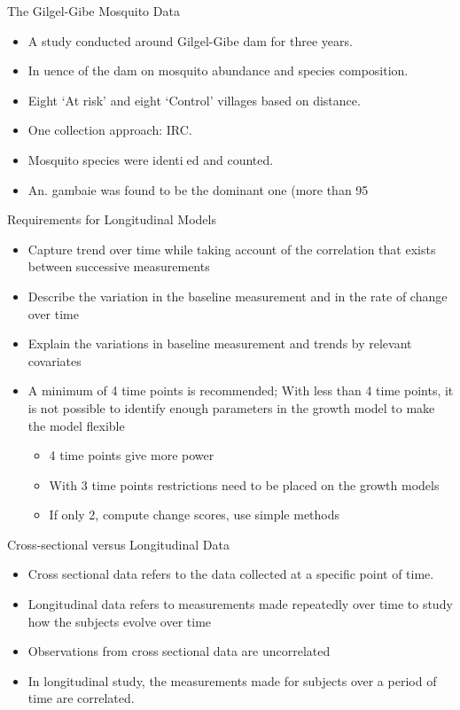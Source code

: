 \documentclass{beamer}
\begin{document}
\begin{frame}{The Gilgel-Gibe Mosquito Data}
\begin{itemize}
	\item A study conducted around Gilgel-Gibe dam for three years.
	\item In
uence of the dam on mosquito abundance and species composition.
	\item Eight `At risk' and eight `Control' villages based on distance.
	\item One collection approach: IRC.
	\item Mosquito species were identied and counted.
	\item An. gambaie was found to be the dominant one (more than 95%
\end{itemize}
\end{frame}


\begin{frame}{Requirements for Longitudinal Models}
\begin{itemize}
\item Capture trend over time while taking account of the correlation that exists between successive measurements
\item Describe the variation in the baseline measurement and in the rate of change over time
\item Explain the variations in baseline measurement and trends by relevant covariates
\item A minimum of 4 time points is recommended; With less than 4 time points, it is not possible to identify enough parameters in the growth model to make the model flexible
\begin{itemize}
\item  4 time points give more power
\item With 3 time points restrictions need to be placed on the growth models 
\item If only 2, compute change scores, use simple methods
\end{itemize}
\end{itemize}
\end{frame}



\begin{frame}{Cross-sectional versus Longitudinal Data}
\begin{itemize}
\item Cross sectional data refers to the data collected at a specific point of time. 
\item  Longitudinal data refers to measurements made repeatedly over time to study how the subjects evolve over time
\item Observations from cross sectional data are uncorrelated
\item In longitudinal study, the measurements made for subjects over a period of time are correlated.
\end{itemize}
\end{frame}
\end{document}
